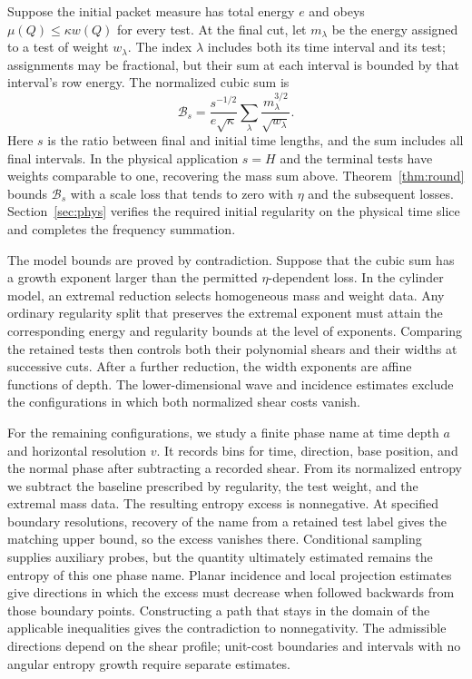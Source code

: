 Suppose the initial packet measure has total energy $e$ and obeys
$\mu(Q)\le\kappa w(Q)$ for every test. At the final cut, let
$m_\lambda$ be the energy assigned to a test of weight $w_\lambda$.
The index $\lambda$ includes both its time interval and its test;
assignments may be fractional, but their sum at each interval is
bounded by that interval's row energy. The normalized cubic sum is
\begin{equation}\label{eq:intro-functional}
 \mathcal B_s=
 \frac{s^{-1/2}}{e\sqrt\kappa}
 \sum_\lambda\frac{m_\lambda^{3/2}}{\sqrt{w_\lambda}}.
\end{equation}
Here $s$ is the ratio between final and initial time lengths, and the
sum includes all final intervals. In the physical application $s=H$
and the terminal tests have weights comparable to one, recovering the
mass sum above. Theorem~\ref{thm:round} bounds $\mathcal B_s$ with a
scale loss that tends to zero with $\eta$ and the subsequent losses.
Section~\ref{sec:phys} verifies the required initial regularity on the
physical time slice and completes the frequency summation.

The model bounds are proved by contradiction. Suppose that the cubic
sum has a growth exponent larger than the permitted $\eta$-dependent
loss. In the cylinder model, an extremal reduction selects homogeneous
mass and weight data. Any ordinary regularity split that preserves the
extremal exponent must attain the corresponding energy and regularity
bounds at the level of exponents. Comparing the retained tests then
controls both their polynomial shears and their widths at successive
cuts. After a further reduction, the width exponents are affine
functions of depth. The lower-dimensional wave and incidence estimates
exclude the configurations in which both normalized shear costs vanish.

For the remaining configurations, we study a finite phase name at time
depth $a$ and horizontal resolution $v$. It records bins for time,
direction, base position, and the normal phase after subtracting a
recorded shear. From its normalized entropy we subtract the baseline
prescribed by regularity, the test weight, and the extremal mass data.
The resulting entropy excess is nonnegative. At specified boundary
resolutions, recovery of the name from a retained test label gives the
matching upper bound, so the excess vanishes there.
Conditional sampling supplies auxiliary probes, but the quantity
ultimately estimated remains the entropy of this one phase name.
Planar incidence and local projection estimates give directions in
which the excess must decrease when followed backwards from those
boundary points. Constructing a path that stays in the domain of the
applicable inequalities gives the contradiction to nonnegativity.
The admissible directions depend on the shear profile; unit-cost
boundaries and intervals with no angular entropy growth require
separate estimates.

